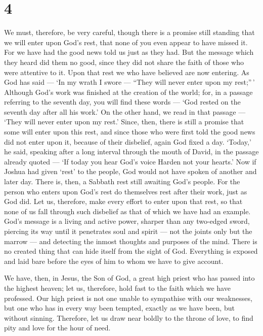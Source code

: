 \hypertarget{section-3}{%
\section{4}\label{section-3}}

 We must, therefore, be very careful, though there is a
promise still standing that we will enter upon God's rest, that none of
you even appear to have missed it.  For we have had the good
news told us just as they had. But the message which they heard did them
no good, since they did not share the faith of those who were attentive
to it.  Upon that rest we who have believed are now
entering. As God has said --- `In my wrath I swore --- ``They will never
enter upon my rest;''\,' Although God's work was finished at the
creation of the world;  for, in a passage referring to the
seventh day, you will find these words --- `God rested on the seventh
day after all his work.'  On the other hand, we read in that
passage --- `They will never enter upon my rest.'  Since,
then, there is still a promise that some will enter upon this rest, and
since those who were first told the good news did not enter upon it,
because of their disbelief,  again God fixed a day. `Today,'
he said, speaking after a long interval through the mouth of David, in
the passage already quoted --- `If today you hear God's voice Harden not
your hearts.'  Now if Joshua had given `rest' to the people,
God would not have spoken of another and later day.  There
is, then, a Sabbath rest still awaiting God's people.  For
the person who enters upon God's rest do themselves rest after their
work, just as God did.  Let us, therefore, make every
effort to enter upon that rest, so that none of us fall through such
disbelief as that of which we have had an example.  God's
message is a living and active power, sharper than any two-edged sword,
piercing its way until it penetrates soul and spirit --- not the joints
only but the marrow --- and detecting the inmost thoughts and purposes
of the mind.  There is no created thing that can hide
itself from the sight of God. Everything is exposed and laid bare before
the eyes of him to whom we have to give account.

 We have, then, in Jesus, the Son of God, a great high
priest who has passed into the highest heaven; let us, therefore, hold
fast to the faith which we have professed.  Our high priest
is not one unable to sympathise with our weaknesses, but one who has in
every way been tempted, exactly as we have been, but without sinning.
 Therefore, let us draw near boldly to the throne of love,
to find pity and love for the hour of need.


